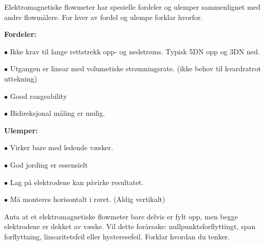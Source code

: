 

Elektromagnetiske flowmeter har spesielle fordeler og ulemper sammenlignet med andre flowm{\aa}lere. For hver av fordel og ulempe forklar hvorfor. 
\vskip 10pt

{\bf Fordeler:}

\medskip
\item{$\bullet$} Ikke krav til lange rettstrekk opp- og nedstr{\o}ms. Typisk 5DN opp og 3DN ned. %
\item{$\bullet$} Utgangen er linear med volumetiske str{\o}mningsrate. (ikke behov til kvardratrot uttekning) %
\item{$\bullet$} Good rangeability
\item{$\bullet$} Bidireksjonal m{\aa}ling er mulig. %
\medskip

\vskip 10pt

{\bf Ulemper:}

\medskip
\item{$\bullet$} Virker bare med ledende v{\ae}sker. %
\item{$\bullet$} God jording er essensielt %
\item{$\bullet$} Lag p{\aa} elektrodene kan p{\aa}virke resultatet. %
\item{$\bullet$} M{\aa} monteres horisontalt i r{\o}ret. (Aldig vertikalt) %
\medskip

\vskip 10pt

Anta at et elektromagnetiske flowmeter bare delvis er fylt opp, men begge elektrodene er dekket av v{\ae}ske. Vil dette for{\aa}rsake: nullpunktsforflyttingt, span forflyttning, linearitetsfeil eller hysteresefeil. Forklar hvordan du tenker.

